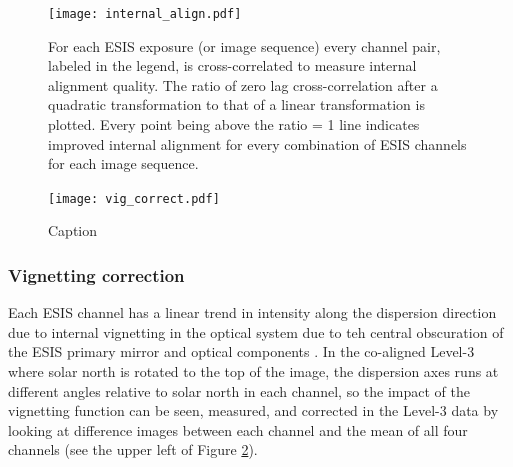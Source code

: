     	
     	\begin{figure}[htb!]
    		\centering
    		\texttt{[image: internal\_align.pdf]}
    		\caption{For each ESIS exposure (or image sequence) every channel pair, labeled in the legend, is cross-correlated to measure internal alignment quality.  The ratio of zero lag cross-correlation after a quadratic transformation to that of a linear transformation is plotted.  Every point being above the ratio = 1 line indicates improved internal alignment for every combination of ESIS channels for each image sequence.}
    		\label{fig:cc}	
    	\end{figure}
    	
 		\begin{figure}[htb!]
			\centering
			\texttt{[image: vig\_correct.pdf]}
			\caption{Caption}
			\label{fig:vig_correct}
		\end{figure}

  \subsubsection{Vignetting correction}
  
  
        Each ESIS channel has a linear trend in intensity along the dispersion direction due to internal vignetting in the optical system due to teh central obscuration of the ESIS primary mirror and optical components \citep{ESIS}.   In the co-aligned Level-3 where solar north is rotated to the top of the image, the dispersion axes runs at different angles relative to solar north in each channel, so the impact of the vignetting function can be seen, measured, and corrected in the Level-3 data by looking at difference images between each channel and the mean of all four channels (see the upper left of Figure \ref{fig:vig_correct}).
        
